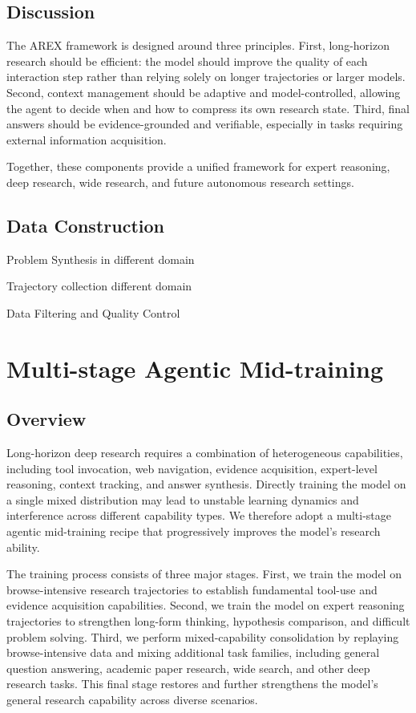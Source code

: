 \documentclass[]{selfevolagent}
\theoremstyle{plain}
\theoremstyle{definition}
\theoremstyle{remark}
\begin{document}
\subsection{Discussion}

The AREX framework is designed around three principles. First, long-horizon research should be efficient: the model should improve the quality of each interaction step rather than relying solely on longer trajectories or larger models. Second, context management should be adaptive and model-controlled, allowing the agent to decide when and how to compress its own research state. Third, final answers should be evidence-grounded and verifiable, especially in tasks requiring external information acquisition.

Together, these components provide a unified framework for expert reasoning, deep research, wide research, and future autonomous research settings.



\subsection{Data Construction}


Problem Synthesis in different domain

Trajectory collection different domain

Data Filtering and Quality Control

\section{Multi-stage Agentic Mid-training}

\subsection{Overview}

Long-horizon deep research requires a combination of heterogeneous capabilities, including tool invocation, web navigation, evidence acquisition, expert-level reasoning, context tracking, and answer synthesis. Directly training the model on a single mixed distribution may lead to unstable learning dynamics and interference across different capability types. We therefore adopt a multi-stage agentic mid-training recipe that progressively improves the model's research ability.

The training process consists of three major stages. First, we train the model on browse-intensive research trajectories to establish fundamental tool-use and evidence acquisition capabilities. Second, we train the model on expert reasoning trajectories to strengthen long-form thinking, hypothesis comparison, and difficult problem solving. Third, we perform mixed-capability consolidation by replaying browse-intensive data and mixing additional task families, including general question answering, academic paper research, wide search, and other deep research tasks. This final stage restores and further strengthens the model's general research capability across diverse scenarios.
\end{document}
